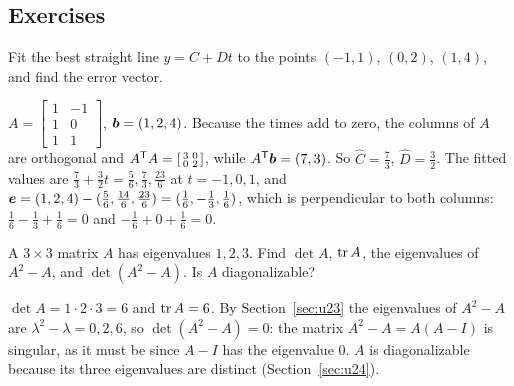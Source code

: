 \subsection{Exercises}

\begin{exercise}\label{exr:u27-line}
Fit the best straight line $y=C+Dt$ to the points $(-1,1)$, $(0,2)$, $(1,4)$, and find the
error vector.
\end{exercise}
\begin{solution}
$A=\left[\begin{smallmatrix} 1&-1\\ 1&0\\ 1&1\end{smallmatrix}\right]$, $\boldsymbol{b}=(1,2,4)$.
Because the times add to zero, the columns of $A$ are orthogonal and
$A^{\mathsf{T}} A=\left[\begin{smallmatrix} 3&0\\ 0&2\end{smallmatrix}\right]$, while $A^{\mathsf{T}}\boldsymbol{b}=(7,3)$.
So $\hat C=\tfrac73$, $\hat D=\tfrac32$. The fitted values are
$\tfrac73+\tfrac32t=\tfrac56,\tfrac73,\tfrac{23}{6}$ at $t=-1,0,1$, and
$\boldsymbol{e}=(1,2,4)-(\tfrac56,\tfrac{14}{6},\tfrac{23}{6})=(\tfrac16,-\tfrac13,\tfrac16)$, which is
perpendicular to both columns: $\tfrac16-\tfrac13+\tfrac16=0$ and $-\tfrac16+0+\tfrac16=0$.
\end{solution}

\begin{exercise}\label{exr:u27-eigalg}
A $3\times3$ matrix $A$ has eigenvalues $1,2,3$. Find $\det A$, $\operatorname{tr} A$, the eigenvalues of
$A^{2}-A$, and $\det(A^{2}-A)$. Is $A$ diagonalizable?
\end{exercise}
\begin{solution}
$\det A=1\cdot2\cdot3=6$ and $\operatorname{tr} A=6$. By Section~\ref{sec:u23} the
eigenvalues of $A^{2}-A$ are $\lambda^{2}-\lambda=0,2,6$, so $\det(A^{2}-A)=0$: the matrix
$A^{2}-A=A(A-I)$ is singular, as it must be since $A-I$ has the eigenvalue $0$. $A$ is
diagonalizable because its three eigenvalues are distinct (Section~\ref{sec:u24}).
\end{solution}

